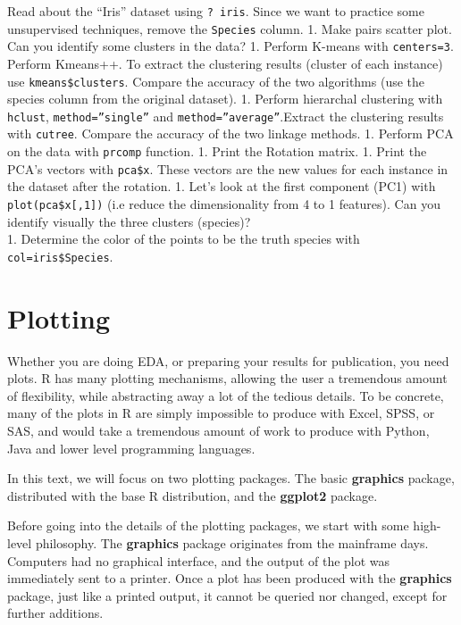 \documentclass[]{book}
\theoremstyle{definition}
\theoremstyle{definition}
\theoremstyle{definition}
\theoremstyle{remark}
\begin{document}
Read about the ``Iris'' dataset using \texttt{?\ iris}. Since we want to
practice some unsupervised techniques, remove the \texttt{Species}
column. 1. Make pairs scatter plot. Can you identify some clusters in
the data? 1. Perform K-means with \texttt{centers=3}. Perform Kmeans++.
To extract the clustering results (cluster of each instance) use
\texttt{kmeans\$clusters}. Compare the accuracy of the two algorithms
(use the species column from the original dataset). 1. Perform
hierarchal clustering with \texttt{hclust}, \texttt{method=”single”} and
\texttt{method=”average”}.Extract the clustering results with
\texttt{cutree}. Compare the accuracy of the two linkage methods. 1.
Perform PCA on the data with \texttt{prcomp} function. 1. Print the
Rotation matrix. 1. Print the PCA's vectors with \texttt{pca\$x}. These
vectors are the new values for each instance in the dataset after the
rotation. 1. Let's look at the first component (PC1) with
\texttt{plot(pca\$x{[},1{]})} (i.e reduce the dimensionality from 4 to 1
features). Can you identify visually the three clusters (species)?\\
1. Determine the color of the points to be the truth species with
\texttt{col=iris\$Species}.

\chapter{Plotting}\label{plotting}

Whether you are doing EDA, or preparing your results for publication,
you need plots. R has many plotting mechanisms, allowing the user a
tremendous amount of flexibility, while abstracting away a lot of the
tedious details. To be concrete, many of the plots in R are simply
impossible to produce with Excel, SPSS, or SAS, and would take a
tremendous amount of work to produce with Python, Java and lower level
programming languages.

In this text, we will focus on two plotting packages. The basic
\textbf{graphics} package, distributed with the base R distribution, and
the \textbf{ggplot2} package.

Before going into the details of the plotting packages, we start with
some high-level philosophy. The \textbf{graphics} package originates
from the mainframe days. Computers had no graphical interface, and the
output of the plot was immediately sent to a printer. Once a plot has
been produced with the \textbf{graphics} package, just like a printed
output, it cannot be queried nor changed, except for further additions.
\end{document}
